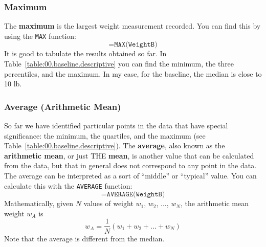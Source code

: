 \subsubsection{Maximum}
%
The \textbf{maximum} is the largest weight measurement recorded. You can find this by using the \texttt{MAX} function:
\begin{equation}
    \texttt{=MAX(WeightB)}
    \label{eq:00.max}
\end{equation}
It is good to tabulate the results obtained so far. In Table~\ref{table:00.baseline.descriptive} you can find the minimum, the three percentiles, and the maximum. In my case, for the baseline, the median is close to 10 lb.
%
\begin{center}
\end{center}
%
\subsubsection{Average (Arithmetic Mean)}
%
So far we have identified particular points in the data that have special significance: the minimum, the quartiles, and the maximum (see Table~\ref{table:00.baseline.descriptive}). The \textbf{average}, also known as the \textbf{arithmetic mean}, or just THE \textbf{mean}, is another value that can be calculated from the data, but that in general does not correspond to any point in the data. The average can be interpreted as a sort of ``middle'' or ``typical'' value. You can calculate this with the \texttt{AVERAGE} function:
\begin{equation}
    \texttt{=AVERAGE(WeightB)}
    \label{eq:00.average}
\end{equation}
Mathematically, given $N$ values of weight $w_{1}$, $w_{2}$, ..., $w_{N}$, the arithmetic mean weight $w_{A}$ is
\begin{equation}
    w_{A} = \frac{1}{N} \left( w_{1} + w_{2} + ... + w_{N} \right)
\end{equation}
Note that the average is different from the median.
%
\begin{center}
\end{center}
%
